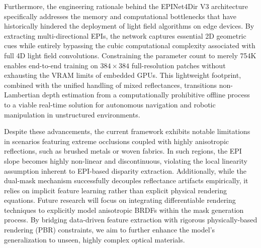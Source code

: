 Furthermore, the engineering rationale behind the EPINet4Dir V3 architecture specifically addresses the memory and computational bottlenecks that have historically hindered the deployment of light field algorithms on edge devices. By extracting multi-directional EPIs, the network captures essential 2D geometric cues while entirely bypassing the cubic computational complexity associated with full 4D light field convolutions. Constraining the parameter count to merely 754K enables end-to-end training on $384 \times 384$ full-resolution patches without exhausting the VRAM limits of embedded GPUs. This lightweight footprint, combined with the unified handling of mixed reflectances, transitions non-Lambertian depth estimation from a computationally prohibitive offline process to a viable real-time solution for autonomous navigation and robotic manipulation in unstructured environments.

Despite these advancements, the current framework exhibits notable limitations in scenarios featuring extreme occlusions coupled with highly anisotropic reflections, such as brushed metals or woven fabrics. In such regions, the EPI slope becomes highly non-linear and discontinuous, violating the local linearity assumption inherent to EPI-based disparity extraction. Additionally, while the dual-mask mechanism successfully decouples reflectance artifacts empirically, it relies on implicit feature learning rather than explicit physical rendering equations. Future research will focus on integrating differentiable rendering techniques to explicitly model anisotropic BRDFs within the mask generation process. By bridging data-driven feature extraction with rigorous physically-based rendering (PBR) constraints, we aim to further enhance the model's generalization to unseen, highly complex optical materials.

